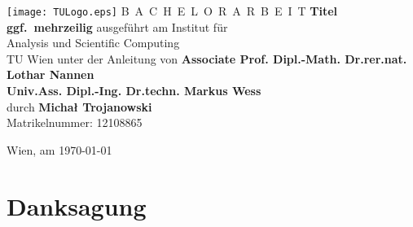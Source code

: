 \documentclass[a4paper,11pt,bibliography=totoc,listof=totoc,headinclude=true,cleardoublepage=empty,oneside]{scrbook}
\begin{document}


\begin{titlepage}
  \begin{center}
    \texttt{[image: TULogo.eps]}
    \vskip 1cm%
    {\LARGE B~\Large A~C~H~E~L~O~R~A~R~B~E~I~T}
    \vskip 8mm
    {\huge\bfseries\color{change}Titel \\[1ex] ggf.\ mehrzeilig}
    \vskip 1cm
    \large 
    ausgef\"uhrt am    
    \vskip 0.75cm
    {\Large Institut f\"ur\\[1ex] Analysis und Scientific Computing}\\[1ex]
    {\Large TU Wien}
    \vskip0.75cm
    unter der Anleitung von
    \vskip0.75cm
    {\Large\bfseries 
Associate Prof. Dipl.-Math. Dr.rer.nat. Lothar Nannen \\ 
Univ.Ass. Dipl.-Ing. Dr.techn. Markus Wess}\\[1ex]
    \vskip 0.5cm
    durch
    \vskip 0.5cm
    {\Large\bfseries Michał Trojanowski}\\[1ex]
    Matrikelnummer: 12108865\\[1ex]
  \end{center}
  
  \vfill
  
  \small
  Wien, am \today
  \vspace*{-15mm}
\end{titlepage}

\cleardoublepage


\chapter*{Danksagung} %
\thispagestyle{empty}
\end{document}
